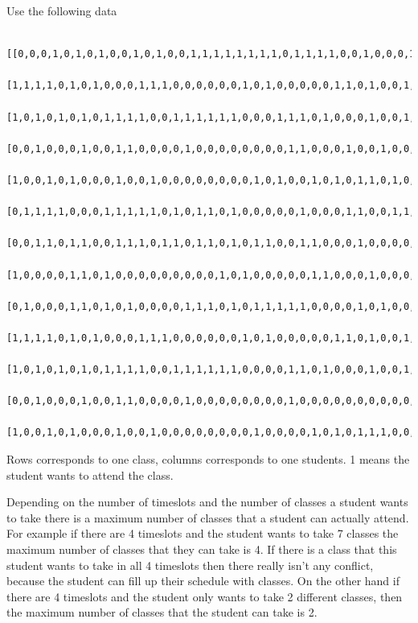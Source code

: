 \documentclass[11pt, oneside]{article}
\begin{document}
\begin{enumerate}
        Use the following data
        {
        \tiny
            \begin{verbatim}
                [[0,0,0,1,0,1,0,1,0,0,1,0,1,0,0,1,1,1,1,1,1,1,1,0,1,1,1,1,0,0,1,0,0,0,1,1,1,1,1,1,0,1,1,1,1,1,1,0,0,1,0,1,0,0],
                [1,1,1,1,0,1,0,1,0,0,0,1,1,1,0,0,0,0,0,0,1,0,1,0,0,0,0,0,1,1,0,1,0,0,1,0,0,0,1,0,1,0,1,0,0,0,0,1,0,0,1,1,1,0],
                [1,0,1,0,1,0,1,0,1,1,1,1,0,0,1,1,1,1,1,1,0,0,0,1,1,1,0,1,0,0,0,1,0,0,1,1,0,1,1,1,0,1,1,1,1,1,0,0,0,1,1,0,0,0],
                [0,0,1,0,0,0,1,0,0,1,1,0,0,0,0,1,0,0,0,0,0,0,0,0,1,1,0,0,0,1,0,0,1,0,0,0,1,0,0,0,0,0,0,0,1,1,1,0,1,1,0,0,0,0],
                [1,0,0,1,0,1,0,0,0,1,0,0,1,0,0,0,0,0,0,0,0,1,0,1,0,0,1,0,1,0,1,1,0,1,0,0,0,0,0,0,0,0,0,0,0,0,0,0,1,0,0,0,1,0],
                [0,1,1,1,1,0,0,0,1,1,1,1,1,0,1,0,1,1,0,1,0,0,0,0,0,1,0,0,0,1,1,0,0,1,1,0,1,1,1,1,0,0,0,1,1,1,1,0,0,1,0,1,0,1],
                [0,0,1,1,0,1,1,0,0,1,1,1,0,1,1,0,1,1,0,1,0,1,1,0,0,1,1,0,0,0,1,0,0,0,0,0,0,1,0,0,0,0,1,1,0,1,1,0,0,1,0,1,1,0],
                [1,0,0,0,0,1,1,0,1,0,0,0,0,0,0,0,0,0,1,0,1,0,0,0,0,0,1,1,0,0,0,1,0,0,0,1,0,0,0,0,0,0,1,0,1,0,1,0,1,0,0,0,0,0],
                [0,1,0,0,0,1,1,0,1,0,1,0,0,0,0,1,1,1,0,1,0,1,1,1,1,1,0,0,0,0,1,0,1,0,0,0,1,0,1,1,0,0,1,1,1,0,1,0,0,0,0,1,0,1],
                [1,1,1,1,0,1,0,1,0,0,0,1,1,1,0,0,0,0,0,0,1,0,1,0,0,0,0,0,1,1,0,1,0,0,1,0,0,0,1,0,1,0,1,0,0,0,0,1,0,0,1,1,1,0],
                [1,0,1,0,1,0,1,0,1,1,1,1,0,0,1,1,1,1,1,1,0,0,0,0,1,1,0,1,0,0,0,1,0,0,1,1,0,1,1,1,0,1,1,1,1,1,0,0,0,1,1,0,0,0],
                [0,0,1,0,0,0,1,0,0,1,1,0,0,0,0,1,0,0,0,0,0,0,0,0,1,0,0,0,0,0,0,0,0,0,0,0,1,0,0,0,0,0,0,0,1,1,1,0,1,1,0,0,0,0],
                [1,0,0,1,0,1,0,0,0,1,0,0,1,0,0,0,0,0,0,0,0,1,0,0,0,0,1,0,1,0,1,1,1,0,0,0,0,0,0,0,0,0,0,0,0,0,0,0,1,0,0,0,1,0]]
            \end{verbatim}
        }
        Rows corresponds to one class, columns corresponds to one students.
        1 means the student wants to attend the class.

        Depending on the number of timeslots and the number of classes a
        student wants to take there is a maximum number of classes that a
        student can actually attend.
        For example if there are 4 timeslots and the student wants to take 7
        classes the maximum number of classes that they can take is 4.
        If there is a class that this student wants to take in all 4 timeslots
        then there really isn't any conflict, because the student can fill up
        their schedule with classes.
        On the other hand if there are 4 timeslots and the student only wants to
        take 2 different classes, then the maximum number of classes that the
        student can take is 2.


\end{enumerate}
\end{document}
